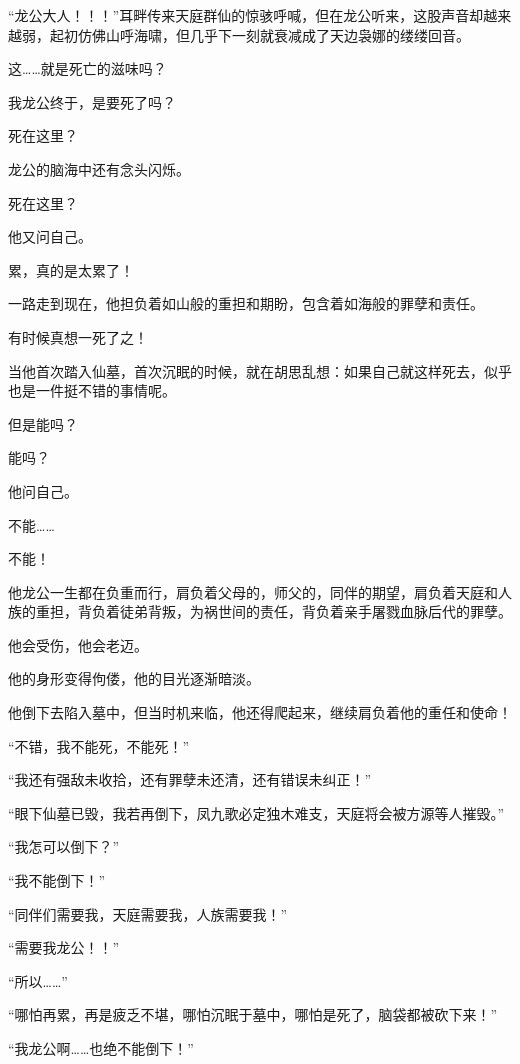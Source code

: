 
\begin{this_body}

“龙公大人！！！”耳畔传来天庭群仙的惊骇呼喊，但在龙公听来，这股声音却越来越弱，起初仿佛山呼海啸，但几乎下一刻就衰减成了天边袅娜的缕缕回音。

这……就是死亡的滋味吗？

我龙公终于，是要死了吗？

死在这里？

龙公的脑海中还有念头闪烁。

死在这里？

他又问自己。

累，真的是太累了！

一路走到现在，他担负着如山般的重担和期盼，包含着如海般的罪孽和责任。

有时候真想一死了之！

当他首次踏入仙墓，首次沉眠的时候，就在胡思乱想：如果自己就这样死去，似乎也是一件挺不错的事情呢。

但是能吗？

能吗？

他问自己。

不能……

不能！

他龙公一生都在负重而行，肩负着父母的，师父的，同伴的期望，肩负着天庭和人族的重担，背负着徒弟背叛，为祸世间的责任，背负着亲手屠戮血脉后代的罪孽。

他会受伤，他会老迈。

他的身形变得佝偻，他的目光逐渐暗淡。

他倒下去陷入墓中，但当时机来临，他还得爬起来，继续肩负着他的重任和使命！

“不错，我不能死，不能死！”

“我还有强敌未收拾，还有罪孽未还清，还有错误未纠正！”

“眼下仙墓已毁，我若再倒下，凤九歌必定独木难支，天庭将会被方源等人摧毁。”

“我怎可以倒下？”

“我不能倒下！”

“同伴们需要我，天庭需要我，人族需要我！”

“需要我龙公！！”

“所以……”

“哪怕再累，再是疲乏不堪，哪怕沉眠于墓中，哪怕是死了，脑袋都被砍下来！”

“我龙公啊……也绝不能倒下！”


\end{this_body}
